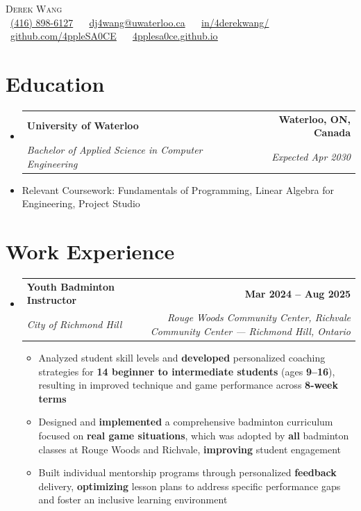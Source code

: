 \documentclass[letterpaper,11pt]{article}
\makeatletter
\newcommand{\resumeItem}[1]{
  \item\small{
    {#1 \vspace{0pt}}
  }
}
\newcommand{\resumeSubheading}[4]{
  \vspace{-2pt}\item
    \begin{tabular*}{1.0\textwidth}[t]{l@{\extracolsep{\fill}}r}
      \textbf{#1} & \textbf{\small #2} \\
      \textit{\small#3} & \textit{\small #4} \\
    \end{tabular*}\vspace{-7pt}
}
\newcommand{\resumeSubHeadingListStart}{\begin{itemize}[leftmargin=0.0in, label={}]}
\newcommand{\resumeSubHeadingListEnd}{\end{itemize}}\vspace{0pt}
\newcommand{\resumeItemListStart}{\begin{itemize}}
\newcommand{\resumeItemListEnd}{\end{itemize}\vspace{-5pt}}
\makeatother
\begin{document}
\begin{center}
    {\Large \scshape Derek Wang} \\[2mm]
    \footnotesize \raisebox{-0.1\height}
    \faPhone\ \underline{(416) 898-6127} ~ 
    {\faEnvelope\  \underline{dj4wang@uwaterloo.ca}} ~ 
    {\faLinkedin\ \underline{\href{https://www.linkedin.com/in/4derekwang/}{in/4derekwang/}}}  ~
    {\faGithub\ \underline{\href{https://github.com/4ppleSA0CE}{github.com/4ppleSA0CE}}} ~
    {\faBriefcase\ \underline{\href{https://4pplesa0ce.github.io}{4pplesa0ce.github.io}}}~
    \vspace{-8pt}
\end{center}

\section{Education}
  \resumeSubHeadingListStart
    \resumeSubheading
      {University of Waterloo}{Waterloo, ON, Canada}
      {Bachelor of Applied Science in Computer Engineering}
      {Expected Apr 2030}
  \resumeSubHeadingListEnd
    \resumeItemListStart
        \resumeItem {Relevant Coursework: Fundamentals of Programming, Linear Algebra for Engineering, Project Studio}
    \resumeItemListEnd
    \vspace{-12pt}

\section{Work Experience}
    \resumeSubHeadingListStart
                \resumeSubheading{Youth Badminton Instructor}{Mar 2024 -- Aug 2025}{City of Richmond Hill}{Rouge Woods Community Center, Richvale Community Center — Richmond Hill, Ontario} 
                \resumeItemListStart
                    \resumeItem{Analyzed student skill levels and \textbf{developed} personalized coaching strategies for \textbf{14 beginner to intermediate students} (ages \textbf{9–16}), resulting in improved technique and game performance across \textbf{8-week terms}}
                    \resumeItem{Designed and \textbf{implemented} a comprehensive badminton curriculum focused on \textbf{real game situations}, which was adopted by \textbf{all} badminton classes at Rouge Woods and Richvale, \textbf{improving} student engagement}
                    \resumeItem{Built individual mentorship programs through personalized \textbf{feedback} delivery, \textbf{optimizing} lesson plans to address specific performance gaps and foster an inclusive learning environment}
                    \resumeItemListEnd
    \resumeSubHeadingListEnd
    \vspace{-12pt}
\end{document}

